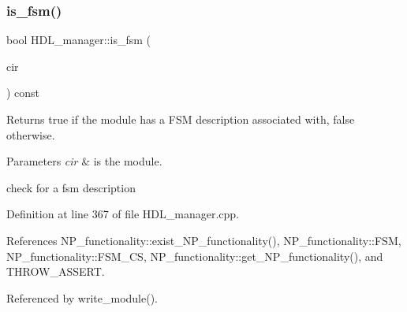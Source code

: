 \subsubsection{\texorpdfstring{is\+\_\+fsm()}{is\_fsm()}}
{\footnotesize\ttfamily bool H\+D\+L\+\_\+manager\+::is\+\_\+fsm (\begin{DoxyParamCaption}\item[{const \hyperlink{structural__objects_8hpp_a8ea5f8cc50ab8f4c31e2751074ff60b2}{structural\+\_\+object\+Ref} \&}]{cir }\end{DoxyParamCaption}) const\hspace{0.3cm}{\ttfamily [private]}}



Returns true if the module has a F\+SM description associated with, false otherwise. 


\begin{DoxyParams}{Parameters}
{\em cir} & is the module. \\
\hline
\end{DoxyParams}
check for a fsm description 

Definition at line 367 of file H\+D\+L\+\_\+manager.\+cpp.



References N\+P\+\_\+functionality\+::exist\+\_\+\+N\+P\+\_\+functionality(), N\+P\+\_\+functionality\+::\+F\+SM, N\+P\+\_\+functionality\+::\+F\+S\+M\+\_\+\+CS, N\+P\+\_\+functionality\+::get\+\_\+\+N\+P\+\_\+functionality(), and T\+H\+R\+O\+W\+\_\+\+A\+S\+S\+E\+RT.



Referenced by write\+\_\+module().

